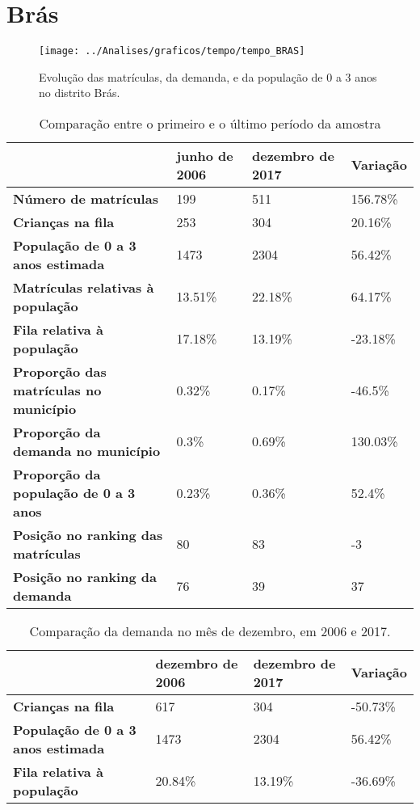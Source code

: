 \section{Brás}
\begin{figure}[H]
\centering
\texttt{[image: ../Analises/graficos/tempo/tempo\_BRAS]}
\caption{Evolução das matrículas, da demanda, e da população de 0 a 3 anos no distrito Brás.}
\end{figure}
\begin{table}[H]
\begin{tabular}{|l|l|l|l|}
\hline
\textbf{}                                      & \textbf{junho de 2006}       & \textbf{dezembro de 2017}    & \textbf{Variação} \\ \hline
\textbf{Número de matrículas}                  & 199 & 511 & 156.78\% \\ \hline
\textbf{Crianças na fila}                      & 253 & 304 & 20.16\% \\ \hline
\textbf{População de 0 a 3 anos estimada}      & 1473 & 2304 & 56.42\% \\ \hline
\textbf{Matrículas relativas à população}      & 13.51\% & 22.18\% & 64.17\% \\ \hline
\textbf{Fila relativa à população}             & 17.18\% & 13.19\% & -23.18\% \\ \hline
\textbf{Proporção das matrículas no município} & 0.32\% & 0.17\% & -46.5\% \\ \hline
\textbf{Proporção da demanda no município}     & 0.3\% & 0.69\% & 130.03\% \\ \hline
\textbf{Proporção da população de 0 a 3 anos}  & 0.23\% & 0.36\% & 52.4\% \\ \hline
\textbf{Posição no ranking das matrículas}     & 80 & 83 & -3 \\ \hline
\textbf{Posição no ranking da demanda}         & 76 & 39 & 37 \\ \hline
\end{tabular}
\caption{Comparação entre o primeiro e o último período da amostra}
\end{table}
\begin{table}[H]
\begin{tabular}{|l|l|l|l|}
\hline
\textbf{}                                 & \textbf{dezembro de 2006} & \textbf{dezembro de 2017} & \textbf{Variação} \\ \hline
\textbf{Crianças na fila}                      & 617 & 304 & -50.73\% \\ \hline
\textbf{População de 0 a 3 anos estimada}      & 1473 & 2304 & 56.42\% \\ \hline
\textbf{Fila relativa à população}             & 20.84\% & 13.19\% & -36.69\% \\ \hline
\end{tabular}
\caption{Comparação da demanda no mês de dezembro, em 2006 e 2017.}
\end{table}
